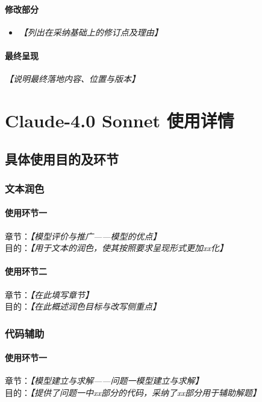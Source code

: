 \documentclass[12pt]{ctexart}
\newcommand{\ph}[1]{\textit{【#1】}}
\begin{document}
\paragraph{修改部分}
\begin{itemize}[leftmargin=1.5em]
  \item \ph{列出在采纳基础上的修订点及理由}
\end{itemize}

\paragraph{最终呈现}
\begin{flushleft}
\ph{说明最终落地内容、位置与版本}
\end{flushleft}

\newpage

\section{Claude-4.0 Sonnet 使用详情}
\subsection{具体使用目的及环节}

\subsubsection{文本润色}
\paragraph{使用环节一}
章节：\ph{模型评价与推广——模型的优点} \\
目的：\ph{用于文本的润色，使其按照要求呈现形式更加xx化}

\paragraph{使用环节二}
章节：\ph{在此填写章节} \\
目的：\ph{在此概述润色目标与改写侧重点}

\subsubsection{代码辅助}
\paragraph{使用环节一}
章节：\ph{模型建立与求解——问题一模型建立与求解} \\
目的：\ph{提供了问题一中xx部分的代码，采纳了xx部分用于辅助解题}
\end{document}
